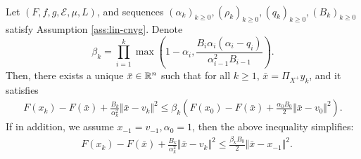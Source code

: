 \documentclass[12pt]{article}
\begin{document}
        \begin{theorem}\;\label{thm:cnvg-generic-seq}\\
            Let $(F, f, g, \mathcal E, \mu, L)$, and sequences $(\alpha_k)_{k \ge 0}, (\rho_k)_{k \ge 0}, (q_k)_{k \ge 0}, (B_k)_{k \ge 0}$ 
            satisfy Assumption \ref{ass:lin-cnvg}. 
            Denote 
            $$
                \beta_k = \prod_{i = 1}^k\max\left(
                    1 - \alpha_i, 
                    \frac{B_i\alpha_i(\alpha_i - q_i)}{\alpha_{i - 1}^2B_{i - 1}}
                \right). 
            $$
            Then, there exists a unique $\bar x \in \mathbb R^n$ such that for all $k \ge 1$, $\bar x = \Pi_{X^+}y_k$, and it satisfies
            \begin{align*}
                F(x_k) - F(\bar x) + \frac{B_k}{\alpha_k^2}\Vert \bar x - v_k\Vert^2 
                \le 
                \beta_k\left(
                    F(x_0) - F(\bar x) + \frac{\alpha_0B_0}{2}\Vert \bar x - v_0\Vert^2
                \right). 
            \end{align*}
            If in addition, we assume $x_{-1} = v_{-1}, \alpha_0 = 1$, then the above inequality simplifies: 
            \begin{align*}
                & F(x_k) - F(\bar x) + \frac{B_k}{\alpha_k^2}\Vert \bar x - v_k\Vert^2 \le 
                \frac{\beta_kB_0}{2}\Vert \bar x - x_{-1}\Vert^2.
            \end{align*}
        \end{theorem}
\end{document}
